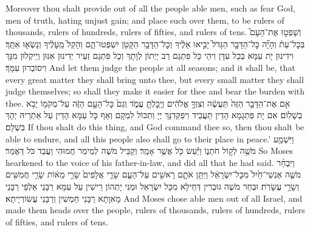 {{Moreover thou shalt provide out of all the people able men, such as fear God, men of truth, hating unjust gain; and place such over them, to be rulers of thousands, rulers of hundreds, rulers of fifties, and rulers of tens.}{}
{וְשָׁפְט֣וּ אֶת־הָעָם֮ בְּכׇל־עֵת֒ וְהָיָ֞ה כׇּל־הַדָּבָ֤ר הַגָּדֹל֙ יָבִ֣יאוּ אֵלֶ֔יךָ וְכׇל־הַדָּבָ֥ר הַקָּטֹ֖ן יִשְׁפְּטוּ־הֵ֑ם וְהָקֵל֙ מֵֽעָלֶ֔יךָ וְנָשְׂא֖וּ אִתָּֽךְ׃
}
{וִידִינוּן יָת עַמָּא בְּכָל עִדָּן וִיהֵי כָּל פִּתְגָם רַב יַיְתוֹן לְוָתָךְ וְכָל פִּתְגָם זְעֵיר יְדִינוּן אִנּוּן וְיֵיקְלוּן מִנָּךְ וִיסוֹבְרוּן עִמָּךְ׃}
{And let them judge the people at all seasons; and it shall be, that every great matter they shall bring unto thee, but every small matter they shall judge themselves; so shall they make it easier for thee and bear the burden with thee.}{}
{אִ֣ם אֶת־הַדָּבָ֤ר הַזֶּה֙ תַּעֲשֶׂ֔ה וְצִוְּךָ֣ אֱלֹהִ֔ים וְיָֽכׇלְתָּ֖ עֲמֹ֑ד וְגַם֙ כׇּל־הָעָ֣ם הַזֶּ֔ה עַל־מְקֹמ֖וֹ יָבֹ֥א בְשָׁלֽוֹם׃
}
{אִם יָת פִּתְגָמָא הָדֵין תַּעֲבֵיד וִיפַקְּדִנָּךְ יְיָ וְתִכּוֹל לִמְקָם וְאַף כָּל עַמָּא הָדֵין עַל אַתְרֵיהּ יְהָךְ בִּשְׁלָם׃}
{If thou shalt do this thing, and God command thee so, then thou shalt be able to endure, and all this people also shall go to their place in peace.’}{}
{וַיִּשְׁמַ֥ע מֹשֶׁ֖ה לְק֣וֹל חֹתְנ֑וֹ וַיַּ֕עַשׂ כֹּ֖ל אֲשֶׁ֥ר אָמָֽר׃}
{וְקַבֵּיל מֹשֶׁה לְמֵימַר חֲמוּהִי וַעֲבַד כֹּל דַּאֲמַר׃}
{So Moses hearkened to the voice of his father-in-law, and did all that he had said.}{}
{וַיִּבְחַ֨ר מֹשֶׁ֤ה אַנְשֵׁי־חַ֙יִל֙ מִכׇּל־יִשְׂרָאֵ֔ל וַיִּתֵּ֥ן אֹתָ֛ם רָאשִׁ֖ים עַל־הָעָ֑ם שָׂרֵ֤י אֲלָפִים֙ שָׂרֵ֣י מֵא֔וֹת שָׂרֵ֥י חֲמִשִּׁ֖ים וְשָׂרֵ֥י עֲשָׂרֹֽת׃}
{וּבְחַר מֹשֶׁה גּוּבְרִין דְּחֵילָא מִכָּל יִשְׂרָאֵל וּמַנִּי יָתְהוֹן רֵישִׁין עַל עַמָּא רַבָּנֵי אַלְפֵי רַבָּנֵי מָאוָתָא רַבָּנֵי חַמְשִׁין וְרַבָּנֵי עֲשׂוֹרְיָיתָא׃}
{And Moses chose able men out of all Israel, and made them heads over the people, rulers of thousands, rulers of hundreds, rulers of fifties, and rulers of tens.}{}
}
